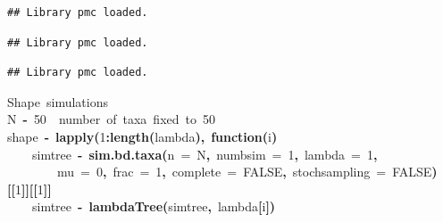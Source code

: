 \documentclass{elsarticle}
\makeatletter
\newcommand{\hlnumber}[1]{\textcolor[rgb]{0,0,0}{#1}}%
\newcommand{\hlfunctioncall}[1]{\textcolor[rgb]{.5,0,.33}{\textbf{#1}}}%
\newcommand{\hlkeyword}[1]{\textbf{#1}}%
\newcommand{\hlargument}[1]{\textcolor[rgb]{.69,.25,.02}{#1}}%
\newcommand{\hlcomment}[1]{\textcolor[rgb]{.18,.6,.34}{#1}}%
\newcommand{\hlformalargs}[1]{\hlargument{#1}}%
\newcommand{\hlassignement}[1]{\textbf{#1}}%
\newcommand{\hlsymbol}[1]{#1}%
\newcommand{\hlstd}[1]{\textcolor[rgb]{0,0,0}{#1}}%
\newenvironment{kframe}{%
 \def\FrameCommand##1{\hskip\@totalleftmargin \hskip-\fboxsep
 \colorbox{shadecolor}{##1}\hskip-\fboxsep
     \hskip-\linewidth \hskip-\@totalleftmargin \hskip\columnwidth}%
 \MakeFramed {\advance\hsize-\width
   \@totalleftmargin\z@ \linewidth\hsize
   \@setminipage}}%
 {\par\unskip\endMakeFramed}
\newenvironment{knitrout}{}{} %
\makeatother
\begin{document}
\begin{knitrout}
\begin{kframe}
\begin{verbatim}
## Library pmc loaded.
\end{verbatim}
\begin{verbatim}
## Library pmc loaded.
\end{verbatim}
\begin{verbatim}
## Library pmc loaded.
\end{verbatim}
\begin{flushleft}
\ttfamily\noindent
\hlcomment{\usebox{\hlnormalsizeboxhash}\usebox{\hlnormalsizeboxhash}{\ }Shape{\ }simulations}\hspace*{\fill}\\
\hlstd{}\hlsymbol{N}{\ }\hlassignement{\usebox{\hlnormalsizeboxlessthan}-}{\ }\hlnumber{50}{\ }{\ }\hlcomment{\usebox{\hlnormalsizeboxhash}\usebox{\hlnormalsizeboxhash}{\ }number{\ }of{\ }taxa{\ }fixed{\ }to{\ }50}\hspace*{\fill}\\
\hlstd{}\hlsymbol{shape}{\ }\hlassignement{\usebox{\hlnormalsizeboxlessthan}-}{\ }\hlfunctioncall{lapply}\hlkeyword{(}\hlnumber{1}\hlkeyword{:}\hlfunctioncall{length}\hlkeyword{(}\hlsymbol{lambda}\hlkeyword{)}\hlkeyword{,}{\ }\hlkeyword{function}\hlkeyword{(}\hlformalargs{i}\hlkeyword{)}{\ }\hlkeyword{\usebox{\hlnormalsizeboxopenbrace}}\hspace*{\fill}\\
\hlstd{}{\ }{\ }{\ }{\ }\hlsymbol{simtree}{\ }\hlassignement{\usebox{\hlnormalsizeboxlessthan}-}{\ }\hlfunctioncall{sim.bd.taxa}\hlkeyword{(}\hlargument{n}{\ }\hlargument{=}{\ }\hlsymbol{N}\hlkeyword{,}{\ }\hlargument{numbsim}{\ }\hlargument{=}{\ }\hlnumber{1}\hlkeyword{,}{\ }\hlargument{lambda}{\ }\hlargument{=}{\ }\hlnumber{1}\hlkeyword{,}\hspace*{\fill}\\
\hlstd{}{\ }{\ }{\ }{\ }{\ }{\ }{\ }{\ }\hlargument{mu}{\ }\hlargument{=}{\ }\hlnumber{0}\hlkeyword{,}{\ }\hlargument{frac}{\ }\hlargument{=}{\ }\hlnumber{1}\hlkeyword{,}{\ }\hlargument{complete}{\ }\hlargument{=}{\ }\hlnumber{FALSE}\hlkeyword{,}{\ }\hlargument{stochsampling}{\ }\hlargument{=}{\ }\hlnumber{FALSE}\hlkeyword{)}\hlkeyword{[[}\hlnumber{1}\hlkeyword{]}\hlkeyword{]}\hlkeyword{[[}\hlnumber{1}\hlkeyword{]}\hlkeyword{]}\hspace*{\fill}\\
\hlstd{}{\ }{\ }{\ }{\ }\hlsymbol{simtree}{\ }\hlassignement{\usebox{\hlnormalsizeboxlessthan}-}{\ }\hlfunctioncall{lambdaTree}\hlkeyword{(}\hlsymbol{simtree}\hlkeyword{,}{\ }\hlsymbol{lambda}\hlkeyword{[}\hlsymbol{i}\hlkeyword{]}\hlkeyword{)}\hspace*{\fill}\\

\end{flushleft}
\end{kframe}
\end{knitrout}
\end{document}
